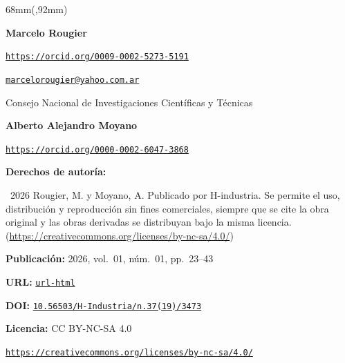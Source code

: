 \begin{textblock*}{68mm}(\gbbloquex,92mm)
{\setlength{\leftskip}{0pt}\setlength{\parindent}{0pt}%
\noindent\begin{minipage}[t]{68mm}
\sffamily\small\setlength{\parskip}{1pt}
{\bfseries\color{azulrevista}Marcelo Rougier}\par
{\scriptsize\texttt{\href{https://orcid.org/0009-0002-5273-5191}{https://orcid.org/0009-0002-5273-5191}}}\par
{\scriptsize\texttt{\href{mailto:marcelorougier@yahoo.com.ar}{marcelorougier@yahoo.com.ar}}}\par
Consejo Nacional de Investigaciones Científicas y Técnicas\par
\vspace{4pt}
{\bfseries\color{azulrevista}Alberto Alejandro Moyano}\par
{\scriptsize\texttt{\href{https://orcid.org/0000-0002-6047-3868}{https://orcid.org/0000-0002-6047-3868}}}\par
\vspace{6pt}
{\bfseries\color{azulrevista!70}Derechos de autor\'ia:}\par
\textcopyright\ 2026 Rougier, M. y Moyano, A. Publicado por H-industria. Se permite el uso, distribución y reproducción sin fines comerciales, siempre que se cite la obra original y las obras derivadas se distribuyan bajo la misma licencia. (\href{https://creativecommons.org/licenses/by-nc-sa/4.0/}{https://creativecommons.org/licenses/by-nc-sa/4.0/})\par\vspace{6pt}
{\bfseries\color{azulrevista!70}Publicación:} 2026, vol.~01, n\'um.~01, pp.~23--43\par\vspace{6pt}
{\bfseries\color{azulrevista!70}URL:} {\scriptsize\texttt{\href{url-html}{url-html}}}\par\vspace{6pt}
{\bfseries\color{azulrevista!70}DOI:} {\scriptsize\texttt{\href{https://doi.org/10.56503/H-Industria/n.37(19)/3473}{10.56503/H-Industria/n.37(19)/3473}}}\par\vspace{6pt}
{\bfseries\color{azulrevista!70}Licencia:} CC BY-NC-SA 4.0\par
{\scriptsize\texttt{\href{https://creativecommons.org/licenses/by-nc-sa/4.0/}{https://creativecommons.org/licenses/by-nc-sa/4.0/}}}\par
\vspace{6pt}

\end{minipage}}
\end{textblock*}
